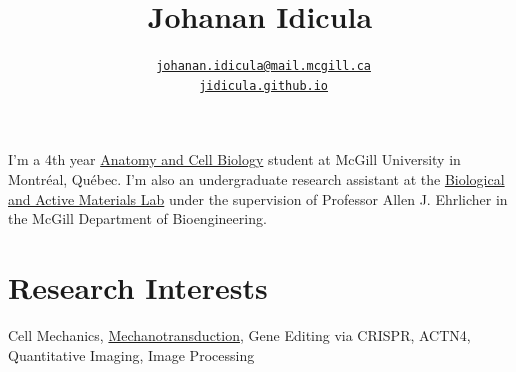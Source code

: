 \documentclass[%
	12pt,%
	]
	{article}
\title{\bfseries\Huge Johanan Idicula}
\author{\tt{\faEnvelopeO{} \href{mailto:johanan.idicula@mail.mcgill.ca}{johanan.idicula@mail.mcgill.ca}} \\ \tt{\faGlobe{} \href{https://jidicula.github.io/}{jidicula.github.io}}}
\date{} %
\begin{document}
\begin{minipage}{0.65\textwidth}
\begingroup
\maketitle
\endgroup
\end{minipage}                  %
\begin{minipage}{0.3\textwidth}
\end{minipage}

\pagestyle{fancy}
\setlength\headheight{14pt}


\thispagestyle{fancy}

I'm a 4th year \href{http://www.mcgill.ca/anatomy}{Anatomy and Cell Biology} student at McGill University in Montr\'eal, Qu\'ebec. I'm also an undergraduate research assistant at the \href{http://bam.lab.mcgill.ca/}{Biological and Active Materials Lab} under the supervision of Professor Allen J. Ehrlicher in the McGill Department of Bioengineering.

\section*{Research Interests}

Cell Mechanics, \href{http://bam.lab.mcgill.ca/project_pages/ACTN4_Mechanosensitivity.html}{Mechanotransduction}, Gene Editing via CRISPR, ACTN4, Quantitative Imaging, Image Processing
\end{document}
